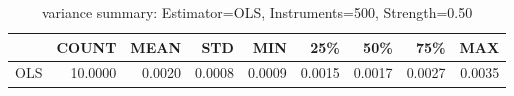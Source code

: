 \begin{table}[ht]
\centering
\caption{variance summary: Estimator=OLS, Instruments=500, Strength=0.50}
\begin{tabular}{lrrrrrrrr}
\toprule
 & COUNT & MEAN & STD & MIN & 25\% & 50\% & 75\% & MAX \\
\midrule
OLS & 10.0000 & 0.0020 & 0.0008 & 0.0009 & 0.0015 & 0.0017 & 0.0027 & 0.0035 \\
\bottomrule
\end{tabular}
\end{table}
